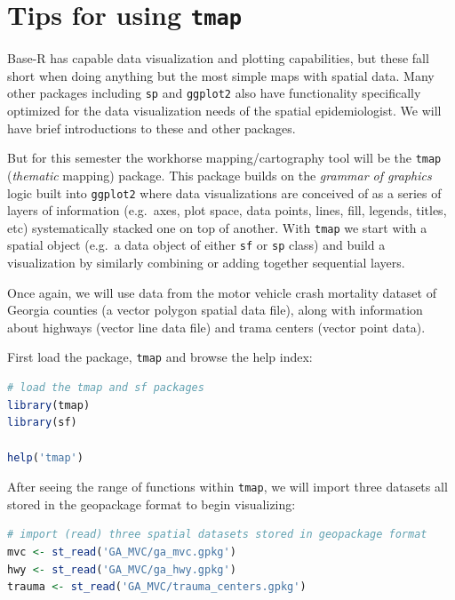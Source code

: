 \documentclass[
]{book}
\newcommand{\passthrough}[1]{#1}
\begin{document}
\hypertarget{intro-tmap}{%
\chapter{\texorpdfstring{Tips for using \texttt{tmap}}{Tips for using tmap}}\label{intro-tmap}}

Base-R has capable data visualization and plotting capabilities, but these fall short when doing anything but the most simple maps with spatial data. Many other packages including \passthrough{\lstinline!sp!} and \passthrough{\lstinline!ggplot2!} also have functionality specifically optimized for the data visualization needs of the spatial epidemiologist. We will have brief introductions to these and other packages.

But for this semester the workhorse mapping/cartography tool will be the \passthrough{\lstinline!tmap!} (\emph{thematic} mapping) package. This package builds on the \emph{grammar of graphics} logic built into \passthrough{\lstinline!ggplot2!} where data visualizations are conceived of as a series of layers of information (e.g.~axes, plot space, data points, lines, fill, legends, titles, etc) systematically stacked one on top of another. With \passthrough{\lstinline!tmap!} we start with a spatial object (e.g.~a data object of either \passthrough{\lstinline!sf!} or \passthrough{\lstinline!sp!} class) and build a visualization by similarly combining or adding together sequential layers.

Once again, we will use data from the motor vehicle crash mortality dataset of Georgia counties (a vector polygon spatial data file), along with information about highways (vector line data file) and trama centers (vector point data).

First load the package, \passthrough{\lstinline!tmap!} and browse the help index:

\begin{lstlisting}[language=R]
# load the tmap and sf packages
library(tmap)
library(sf)

help('tmap')
\end{lstlisting}

After seeing the range of functions within \passthrough{\lstinline!tmap!}, we will import three datasets all stored in the geopackage format to begin visualizing:

\begin{lstlisting}[language=R]
# import (read) three spatial datasets stored in geopackage format
mvc <- st_read('GA_MVC/ga_mvc.gpkg')
hwy <- st_read('GA_MVC/ga_hwy.gpkg')
trauma <- st_read('GA_MVC/trauma_centers.gpkg')
\end{lstlisting}
\end{document}
